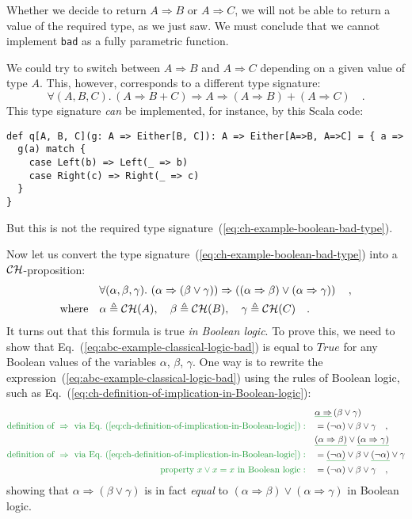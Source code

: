 Whether we decide to return $A\Rightarrow B$ or $A\Rightarrow C$,
we will not be able to return a value of the required type, as we
just saw. We must conclude that we cannot implement \lstinline!bad!
as a fully parametric function.

We could try to switch between $A\Rightarrow B$ and $A\Rightarrow C$
depending on a given value of type $A$. This, however, corresponds
to a different type signature: 
\[
\forall(A,B,C).\,\left(A\Rightarrow B+C\right)\Rightarrow A\Rightarrow\left(A\Rightarrow B\right)+\left(A\Rightarrow C\right)\quad.
\]
This type signature \emph{can} be implemented, for instance, by this
Scala code:
\begin{lstlisting}
def q[A, B, C](g: A => Either[B, C]): A => Either[A=>B, A=>C] = { a =>
  g(a) match {
    case Left(b) => Left(_ => b)
    case Right(c) => Right(_ => c)
  }
}
\end{lstlisting}
But this is not the required type signature~(\ref{eq:ch-example-boolean-bad-type}).

Now let us convert the type signature~(\ref{eq:ch-example-boolean-bad-type})
into a ${\cal CH}$-proposition:
\begin{align}
 & \forall(\alpha,\beta,\gamma).\,\left(\alpha\Rightarrow\left(\beta\vee\gamma\right)\right)\Rightarrow\left(\left(\alpha\Rightarrow\beta\right)\vee\left(\alpha\Rightarrow\gamma\right)\right)\quad,\label{eq:abc-example-classical-logic-bad}\\
\text{where}\quad & \alpha\triangleq{\cal CH}(A),\quad\beta\triangleq{\cal CH}(B),\quad\gamma\triangleq{\cal CH}(C)\quad.\nonumber 
\end{align}
It turns out that this formula is true \emph{in Boolean logic}. To
prove this, we need to show that Eq.~(\ref{eq:abc-example-classical-logic-bad})
is equal to $True$ for any Boolean values of the variables $\alpha$,
$\beta$, $\gamma$. One way is to rewrite the expression~(\ref{eq:abc-example-classical-logic-bad})
using the rules of Boolean logic, such as Eq.~(\ref{eq:ch-definition-of-implication-in-Boolean-logic}):
\begin{align*}
 & \gunderline{\alpha\Rightarrow}\left(\beta\vee\gamma\right)\\
{\color{greenunder}\text{definition of }\Rightarrow\text{ via Eq.~(\ref{eq:ch-definition-of-implication-in-Boolean-logic})}:}\quad & =(\neg\alpha)\vee\beta\vee\gamma\quad,\\
 & \gunderline{\left(\alpha\Rightarrow\beta\right)}\vee\gunderline{\left(\alpha\Rightarrow\gamma\right)}\\
{\color{greenunder}\text{definition of }\Rightarrow\text{ via Eq.~(\ref{eq:ch-definition-of-implication-in-Boolean-logic})}:}\quad & =\gunderline{(\neg\alpha)}\vee\beta\vee\gunderline{(\neg\alpha)}\vee\gamma\\
{\color{greenunder}\text{property }x\vee x=x\text{ in Boolean logic}:}\quad & =(\neg\alpha)\vee\beta\vee\gamma\quad,
\end{align*}
showing that $\alpha\Rightarrow(\beta\vee\gamma)$ is in fact \emph{equal}
to $\left(\alpha\Rightarrow\beta\right)\vee\left(\alpha\Rightarrow\gamma\right)$
in Boolean logic.


